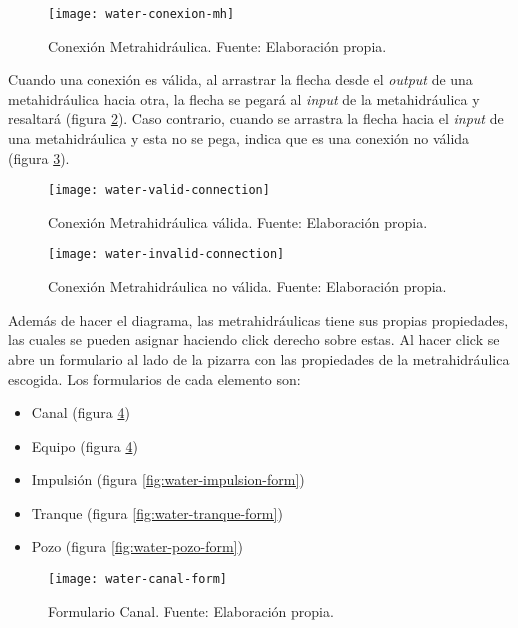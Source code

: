 \begin{figure}[H]
	\centering
	\texttt{[image: water-conexion-mh]}
	\caption{\label{fig:water-conexion-mh} Conexión Metrahidráulica. Fuente: Elaboración propia.}
\end{figure}

Cuando una conexión es válida, al arrastrar la flecha desde el \textit{output} de una metahidráulica hacia otra, la flecha se pegará al \textit{input} de la metahidráulica y resaltará (figura \ref{fig:water-valid-connection}). Caso contrario, cuando se arrastra la flecha hacia el \textit{input} de una metahidráulica y esta no se pega, indica que es una conexión no válida (figura \ref{fig:water-invalid-connection}).

\begin{figure}[H]
	\centering
	\texttt{[image: water-valid-connection]}
	\caption{\label{fig:water-valid-connection} Conexión Metrahidráulica válida. Fuente: Elaboración propia.}
\end{figure}

\begin{figure}[H]
	\centering
	\texttt{[image: water-invalid-connection]}
	\caption{\label{fig:water-invalid-connection} Conexión Metrahidráulica no válida. Fuente: Elaboración propia.}
\end{figure}

Además de hacer el diagrama, las metrahidráulicas tiene sus propias propiedades, las cuales se pueden asignar haciendo click derecho sobre estas. Al hacer click se abre un formulario al lado de la pizarra con las propiedades de la metrahidráulica escogida.
Los formularios de cada elemento son:
\begin{itemize}
    \item Canal (figura \ref{fig:water-canal-form})
    \item Equipo (figura \ref{fig:water-canal-form})
    \item Impulsión (figura \ref{fig:water-impulsion-form})
    \item Tranque (figura \ref{fig:water-tranque-form})
    \item Pozo (figura \ref{fig:water-pozo-form})
\end{itemize}

\begin{figure}[H]
	\centering
	\texttt{[image: water-canal-form]}
	\caption{\label{fig:water-canal-form} Formulario Canal. Fuente: Elaboración propia.}
\end{figure}

